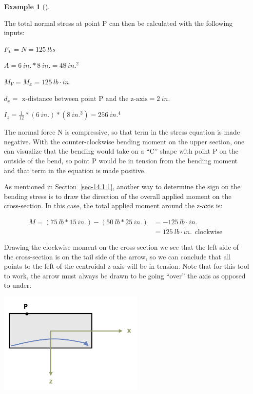 \documentclass[
  letterpaper,
  DIV=11,
  numbers=noendperiod]{scrreprt}
\theoremstyle{definition}
\newtheorem{example}{Example}[chapter]
\theoremstyle{remark}
\begin{document}
\begin{tcolorbox}
\begin{example}[]
\begin{tcolorbox}
The total normal stress at point P can then be calculated with the
following inputs:

\(F_L = N = 125{~lbs}\)

\(A = 6{~in.}*8{~in.} = 48{~in.^2}\)

\(M_V = M_x = 125{~lb}\cdot{in.}\)

\(d_x =\text{ x-distance between point P and the z-axis} = 2{~in.}\)

\(I_z = \frac{1}{12}*(6{~in.})*(8{~in.^3}) = 256{~in.^4}\)

The normal force N is compressive, so that term in the stress equation
is made negative. With the counter-clockwise bending moment on the upper
section, one can visualize that the bending would take on a ``C'' shape
with point P on the outside of the bend, so point P would be in tension
from the bending moment and that term in the equation is made positive.

As mentioned in Section~\ref{sec-14.1.1}, another way to determine the
sign on the bending stress is to draw the direction of the overall
applied moment on the cross-section. In this case, the total applied
moment around the z-axis is:

\[
\begin{aligned}
M=(75{~lb}*15{~in.})-(50{~lb}*25{~in.})&=-125{~lb}\cdot{in.} \\
&=125{~lb}\cdot{in.}~~\text{clockwise }
\end{aligned}
\]

Drawing the clockwise moment on the cross-section we see that the left
side of the cross-section is on the tail side of the arrow, so we can
conclude that all points to the left of the centroidal z-axis will be in
tension. Note that for this tool to work, the arrow must always be drawn
to be going ``over'' the axis as opposed to under.

\begin{center}
\includegraphics[width=2.85417in,height=\textheight]{images/CH14 PNGs/exampe 14.2 part 3.png}
\end{center}


\end{tcolorbox}
\end{example}
\end{tcolorbox}
\end{document}
